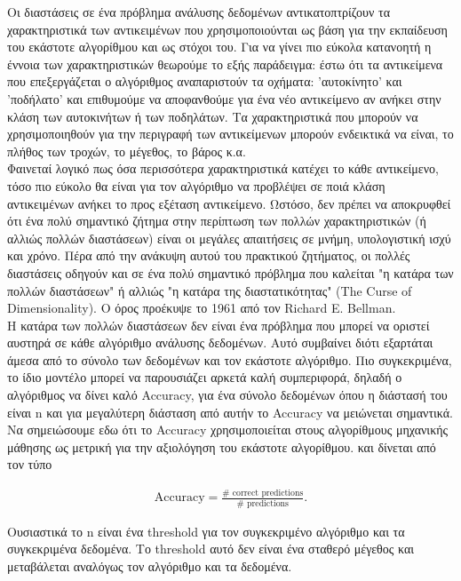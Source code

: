 \documentclass[12pt]{article}
\begin{document}
Οι διαστάσεις σε ένα πρόβλημα ανάλυσης δεδομένων αντικατοπτρίζουν τα χαρακτηριστικά των αντικειμένων που χρησιμοποιούνται ως βάση για την εκπαίδευση του εκάστοτε αλγορίθμου και ως στόχοι του. Για να γίνει πιο εύκολα κατανοητή η έννοια των χαρακτηριστικών θεωρούμε το εξής παράδειγμα: έστω ότι τα αντικείμενα που επεξεργάζεται ο αλγόριθμος αναπαριστούν τα οχήματα: 'αυτοκίνητο' και 'ποδήλατο' και επιθυμούμε να αποφανθούμε για ένα νέο αντικείμενο αν ανήκει στην κλάση των αυτοκινήτων ή των ποδηλάτων. Τα χαρακτηριστικά που μπορούν να χρησιμοποιηθούν για την περιγραφή των αντικείμενων μπορούν ενδεικτικά να είναι, το πλήθος των τροχών, το μέγεθος, το βάρος κ.α. \\

Φαινεταί λογικό πως όσα περισσότερα χαρακτηριστικά κατέχει το κάθε αντικείμενο, τόσο πιο εύκολο θα είναι για τον αλγόριθμο να προβλέψει σε ποιά κλάση αντικειμένων ανήκει το προς εξέταση αντικείμενο. Ωστόσο, δεν πρέπει να αποκρυφθεί ότι ένα πολύ σημαντικό ζήτημα στην περίπτωση των πολλών χαρακτηριστικών (ή αλλιώς πολλών διαστάσεων) είναι οι μεγάλες απαιτήσεις σε μνήμη, υπολογιστική ισχύ και χρόνο. Πέρα από την ανάκυψη αυτού του πρακτικού ζητήματος, οι πολλές διαστάσεις οδηγούν και σε ένα πολύ σημαντικό πρόβλημα που καλείται "η κατάρα των πολλών διαστάσεων" ή αλλιώς "η κατάρα της διαστατικότητας" (The Curse of Dimensionality). Ο όρος προέκυψε το 1961 από τον Richard E. Bellman. \\

Η κατάρα των πολλών διαστάσεων δεν είναι ένα πρόβλημα που μπορεί να οριστεί αυστηρά σε κάθε αλγόριθμο ανάλυσης δεδομένων. Αυτό συμβαίνει διότι εξαρτάται άμεσα από το σύνολο των δεδομένων και τον εκάστοτε αλγόριθμο. Πιο συγκεκριμένα, το ίδιο μοντέλο μπορεί να παρουσιάζει αρκετά καλή συμπεριφορά, δηλαδή ο αλγόριθμος να δίνει καλό Accuracy, για ένα σύνολο δεδομένων όπου η διάστασή του είναι n και για μεγαλύτερη διάσταση από αυτήν το Accuracy να μειώνεται σημαντικά. Να σημειώσουμε εδω ότι το Accuracy χρησιμοποιείται στους αλγορίθμους μηχανικής μάθησης ως μετρική για την αξιολόγηση του εκάστοτε αλγορίθμου. και δίνεται από τον τύπο

\begin{align*}
	\text{Accuracy} = \frac{\# \text{ correct predictions} }{\# \text{ predictions}}.
\end{align*}

Ουσιαστικά το n είναι ένα threshold για τον συγκεκριμένο αλγόριθμο και τα συγκεκριμένα δεδομένα. Το threshold αυτό δεν είναι ένα σταθερό μέγεθος και μεταβάλεται αναλόγως τον αλγόριθμο και τα δεδομένα. \\ 
\end{document}

